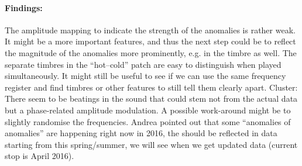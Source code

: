 \documentclass[11pt,a4paper]{article}
\begin{document}
\paragraph{Findings:} The amplitude mapping to indicate the strength of the anomalies is rather weak. It might be a more important features, and thus the next step could be to reflect the magnitude of the anomalies more prominently, e.g. in the timbre as well. The separate timbres in the ``hot--cold'' patch are easy to distinguish when played simultaneously. It might still be useful to see if we can use the same frequency register and find timbres or other features to still tell them clearly apart. Cluster: There seem to be beatings in the sound that could stem not from the actual data but a phase-related amplitude modulation. A possible work-around might be to slightly randomise the frequencies. Andrea pointed out that some ``anomalies of anomalies'' are happening right now in 2016, the should be reflected in data starting from this spring/summer, we will see when we get updated data (current stop is April 2016).

\end{document}
